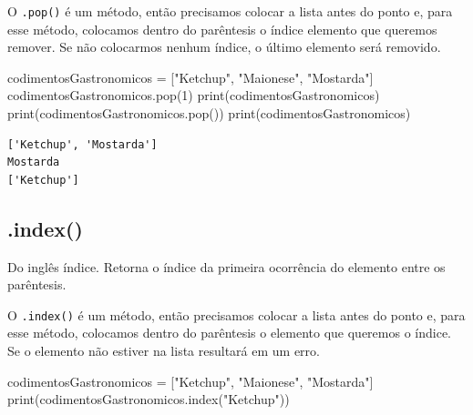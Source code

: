 \documentclass[
  letterpaper,
  DIV=11,
  numbers=noendperiod]{scrreprt}
\newenvironment{Shaded}{\begin{snugshade}}{\end{snugshade}}
\newcommand{\BuiltInTok}[1]{\textcolor[rgb]{0.00,0.23,0.31}{#1}}
\newcommand{\DecValTok}[1]{\textcolor[rgb]{0.68,0.00,0.00}{#1}}
\newcommand{\NormalTok}[1]{\textcolor[rgb]{0.00,0.23,0.31}{#1}}
\newcommand{\OperatorTok}[1]{\textcolor[rgb]{0.37,0.37,0.37}{#1}}
\newcommand{\StringTok}[1]{\textcolor[rgb]{0.13,0.47,0.30}{#1}}
\begin{document}
O \texttt{.pop()} é um método, então precisamos colocar a lista antes do
ponto e, para esse método, colocamos dentro do parêntesis o índice
elemento que queremos remover. Se não colocarmos nenhum índice, o último
elemento será removido.

\begin{Shaded}
\begin{Highlighting}[]
\NormalTok{codimentosGastronomicos }\OperatorTok{=}\NormalTok{ [}\StringTok{"Ketchup"}\NormalTok{, }\StringTok{"Maionese"}\NormalTok{, }\StringTok{"Mostarda"}\NormalTok{]}
\NormalTok{codimentosGastronomicos.pop(}\DecValTok{1}\NormalTok{)}
\BuiltInTok{print}\NormalTok{(codimentosGastronomicos)}
\BuiltInTok{print}\NormalTok{(codimentosGastronomicos.pop())}
\BuiltInTok{print}\NormalTok{(codimentosGastronomicos)}
\end{Highlighting}
\end{Shaded}

\begin{tcolorbox}[enhanced jigsaw, breakable, leftrule=.75mm, left=2mm, opacityback=0, bottomrule=.15mm, toprule=.15mm, rightrule=.15mm, arc=.35mm, colback=white]

\begin{verbatim}
['Ketchup', 'Mostarda']
Mostarda
['Ketchup']
\end{verbatim}

\end{tcolorbox}

\hypertarget{index}{%
\subsection{.index()}\label{index}}

Do inglês índice. Retorna o índice da primeira ocorrência do elemento
entre os parêntesis.

O \texttt{.index()} é um método, então precisamos colocar a lista antes
do ponto e, para esse método, colocamos dentro do parêntesis o elemento
que queremos o índice. Se o elemento não estiver na lista resultará em
um erro.

\begin{Shaded}
\begin{Highlighting}[]
\NormalTok{codimentosGastronomicos }\OperatorTok{=}\NormalTok{ [}\StringTok{"Ketchup"}\NormalTok{, }\StringTok{"Maionese"}\NormalTok{, }\StringTok{"Mostarda"}\NormalTok{]}
\BuiltInTok{print}\NormalTok{(codimentosGastronomicos.index(}\StringTok{"Ketchup"}\NormalTok{))}
\end{Highlighting}
\end{Shaded}
\end{document}

